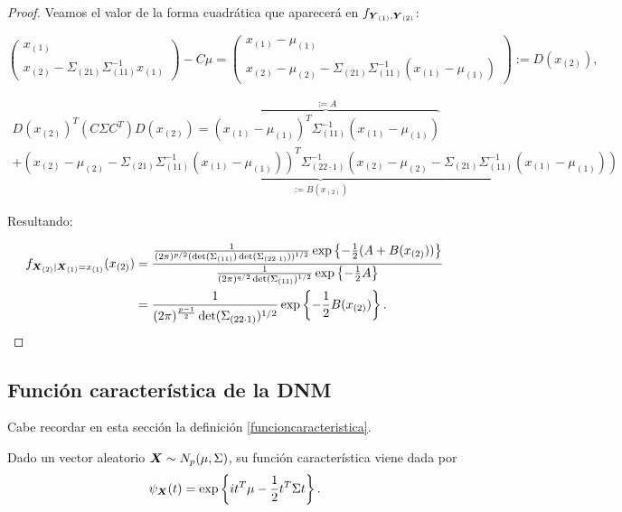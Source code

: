 \begin{proof}
  Veamos el valor de la forma cuadrática que aparecerá en $f_{\boldsymbol{Y}_{(1)}, \boldsymbol{Y}_{(2)}}$:

  \[
     \left(
     \begin{array}{c}
       x_{(1)} \\ \hline
       x_{(2)} - \Sigma_{(21)}\Sigma_{(11)}^{-1}x_{(1)}
     \end{array}
     \right) - C\mu = \left(
     \begin{array}{c}
       x_{(1)} - \mu_{(1)} \\ \hline
       x_{(2)} - \mu_{(2)} - \Sigma_{(21)}\Sigma_{(11)}^{-1}(x_{(1)} - \mu_{(1)})
     \end{array}
     \right) := D(x_{(2)}),
   \]

   \[
   \begin{split}
     D(x_{(2)})^T (C\Sigma C^T) D(x_{(2)}) = \overbrace{(x_{(1)} - \mu_{(1)})^T \Sigma_{(11)}^{-1} (x_{(1)} - \mu_{(1)})}^{:= A} \\
     + \underbrace{(x_{(2)} - \mu_{(2)} - \Sigma_{(21)}\Sigma_{(11)}^{-1}(x_{(1)} - \mu_{(1)}))^T \Sigma_{(22\cdot 1)}^{-1}
       (x_{(2)} - \mu_{(2)} - \Sigma_{(21)}\Sigma_{(11)}^{-1}(x_{(1)} - \mu_{(1)}))}_{:= B(x_{(2)})}
   \end{split}
   \]  

   Resultando:

   \[
   \begin{split}
     f_{\boldsymbol{X}_{(2)} | \boldsymbol{X}_{(1)} = x_{(1)}}(x_{(2)}) & = \frac{ \frac{1}{(2\pi)^{p/2} (\det(\Sigma_{(11)})\det(\Sigma_{(22\cdot 1)}))^{1/2}} \exp\left\{ -\frac{1}{2} (A + B(x_{(2)}))  \right\} }
     { \frac{1}{(2\pi)^{q/2} \det(\Sigma_{(11)})^{1/2}} \exp\left\{ -\frac{1}{2} A \right\} } \\
     & = \frac{1}{(2\pi)^{\frac{p-1}{2}} \det(\Sigma_{(22\cdot 1)})^{1/2}} \exp\left\{ -\frac{1}{2} B(x_{(2)}) \right\}.
   \end{split}
   \]
  \end{proof}



  \subsection{Función característica de la DNM}

  Cabe recordar en esta sección la definición \ref{funcioncaracteristica}.

  \begin{nprop}
    Dado un vector aleatorio $\boldsymbol{X} \sim N_p(\mu, \Sigma)$, su función característica viene dada por
    \[
      \psi_{\boldsymbol{X}}(t) = \exp\left\{ it^T\mu - \frac{1}{2} t^T \Sigma t \right\}
    .\]
  \end{nprop}

